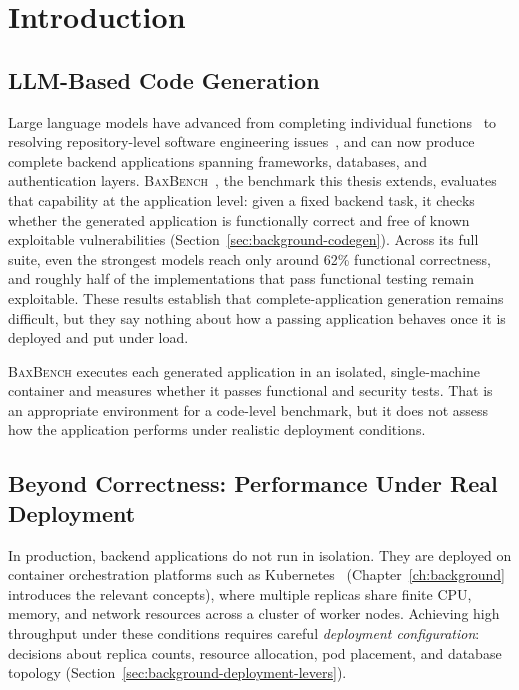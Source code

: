 
\chapter{Introduction}
\label{ch:introduction}

\section{LLM-Based Code Generation}
\label{sec:intro-context}

Large language models have advanced from completing individual
functions~\cite{chen2021humaneval} to resolving repository-level software
engineering issues~\cite{jimenez2024swebench}, and can now produce complete
backend applications spanning frameworks, databases, and authentication
layers. \textsc{BaxBench}~\cite{vero2025baxbench}, the benchmark this thesis
extends, evaluates that capability at the application level: given a fixed
backend task, it checks whether the generated application is functionally
correct and free of known exploitable vulnerabilities
(Section~\ref{sec:background-codegen}). Across its full suite, even the
strongest models reach only around 62\% functional correctness, and roughly
half of the implementations that pass functional testing remain exploitable.
These results establish that complete-application generation remains difficult,
but they say nothing about how a passing application behaves once it is
deployed and put under load.

\textsc{BaxBench} executes each generated application in an isolated,
single-machine container and measures whether it passes functional and
security tests. That is an appropriate environment for a code-level benchmark,
but it does not assess how the application performs under realistic deployment
conditions.


\section{Beyond Correctness: Performance Under Real Deployment}
\label{sec:intro-gap}

In production, backend applications do not run in isolation. They are
deployed on container orchestration platforms such as
Kubernetes~\cite{burns2016borg,kubernetes} (Chapter~\ref{ch:background}
introduces the relevant concepts), where multiple replicas share finite CPU,
memory, and network resources across a cluster of worker nodes. Achieving
high throughput under these conditions requires careful \emph{deployment
configuration}: decisions about replica counts, resource allocation, pod
placement, and database topology
(Section~\ref{sec:background-deployment-levers}).


